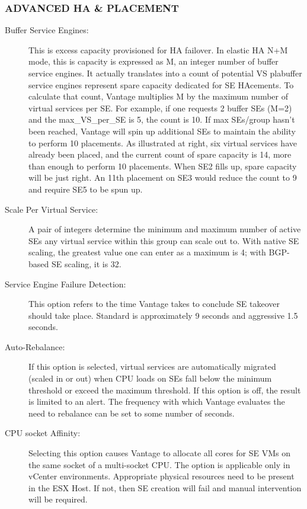 \documentclass[letterpaper,10pt,english]{sphinxmanual}
\begin{document}
\subsubsection{ADVANCED HA \& PLACEMENT}
\label{\detokenize{getting_started/service_engine_group:advanced-ha-placement}}\begin{description}
\item[{Buffer Service Engines:}] \leavevmode
This is excess capacity provisioned for HA failover. In elastic HA N+M mode, this is capacity is expressed as M, an integer number of buffer service engines. It actually translates into a count of potential VS plabuffer service engines represent spare capacity dedicated for SE HAcements. To calculate that count, Vantage multiplies M by the maximum number of virtual services per SE. For example, if one requests 2 buffer SEs (M=2) and the max\_VS\_per\_SE is 5, the count is 10. If max SEs/group hasn't been reached, Vantage will spin up additional SEs to maintain the ability to perform 10 placements. As illustrated at right, six virtual services have already been placed, and the current count of spare capacity is 14, more than enough to perform 10 placements. When SE2 fills up, spare capacity will be just right. An 11th placement on SE3 would reduce the count to 9 and require SE5 to be spun up.

\item[{Scale Per Virtual Service:}] \leavevmode
A pair of integers determine the minimum and maximum number of active SEs any virtual service within this group can scale out to. With native SE scaling, the greatest value one can enter as a maximum is 4; with BGP-based SE scaling, it is 32.

\item[{Service Engine Failure Detection:}] \leavevmode
This option refers to the time Vantage takes to conclude SE takeover should take place. Standard is approximately 9 seconds and aggressive 1.5 seconds.

\item[{Auto-Rebalance:}] \leavevmode
If this option is selected, virtual services are automatically migrated (scaled in or out) when CPU loads on SEs fall below the minimum threshold or exceed the maximum threshold. If this option is off, the result is limited to an alert. The frequency with which Vantage evaluates the need to rebalance can be set to some number of seconds.

\item[{CPU socket Affinity:}] \leavevmode
Selecting this option causes Vantage to allocate all cores for SE VMs on the same socket of a multi-socket CPU. The option is applicable only in vCenter environments. Appropriate physical resources need to be present in the ESX Host. If not, then SE creation will fail and manual intervention will be required.


\end{description}
\end{document}

